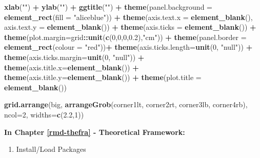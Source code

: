 \documentclass[12pt,twoside]{reedthesis}
\newenvironment{Shaded}{\begin{snugshade}}{\end{snugshade}}
\newcommand{\DataTypeTok}[1]{\textcolor[rgb]{0.13,0.29,0.53}{#1}}
\newcommand{\DecValTok}[1]{\textcolor[rgb]{0.00,0.00,0.81}{#1}}
\newcommand{\FloatTok}[1]{\textcolor[rgb]{0.00,0.00,0.81}{#1}}
\newcommand{\KeywordTok}[1]{\textcolor[rgb]{0.13,0.29,0.53}{\textbf{#1}}}
\newcommand{\NormalTok}[1]{#1}
\newcommand{\OperatorTok}[1]{\textcolor[rgb]{0.81,0.36,0.00}{\textbf{#1}}}
\newcommand{\StringTok}[1]{\textcolor[rgb]{0.31,0.60,0.02}{#1}}
\providecommand{\tightlist}{%
  \setlength{\itemsep}{0pt}\setlength{\parskip}{0pt}}
\begin{document}
\begin{Shaded}
\begin{Highlighting}[]
\StringTok{  }\KeywordTok{xlab}\NormalTok{(}\StringTok{""}\NormalTok{) }\OperatorTok{+}\StringTok{ }
\StringTok{  }\KeywordTok{ylab}\NormalTok{(}\StringTok{""}\NormalTok{) }\OperatorTok{+}\StringTok{ }
\StringTok{  }\KeywordTok{ggtitle}\NormalTok{(}\StringTok{""}\NormalTok{) }\OperatorTok{+}
\StringTok{  }\KeywordTok{theme}\NormalTok{(}\DataTypeTok{panel.background =} \KeywordTok{element_rect}\NormalTok{(}\DataTypeTok{fill =} \StringTok{"aliceblue"}\NormalTok{)) }\OperatorTok{+}
\StringTok{  }\KeywordTok{theme}\NormalTok{(}\DataTypeTok{axis.text.x =} \KeywordTok{element_blank}\NormalTok{(), }\DataTypeTok{axis.text.y =} \KeywordTok{element_blank}\NormalTok{()) }\OperatorTok{+}
\StringTok{  }\KeywordTok{theme}\NormalTok{(}\DataTypeTok{axis.ticks =} \KeywordTok{element_blank}\NormalTok{()) }\OperatorTok{+}
\StringTok{  }\KeywordTok{theme}\NormalTok{(}\DataTypeTok{plot.margin=}\NormalTok{grid}\OperatorTok{::}\KeywordTok{unit}\NormalTok{(}\KeywordTok{c}\NormalTok{(}\DecValTok{0}\NormalTok{,}\DecValTok{0}\NormalTok{,}\DecValTok{0}\NormalTok{,}\FloatTok{0.2}\NormalTok{),}\StringTok{"cm"}\NormalTok{)) }\OperatorTok{+}\StringTok{ }
\StringTok{  }\KeywordTok{theme}\NormalTok{(}\DataTypeTok{panel.border =} \KeywordTok{element_rect}\NormalTok{(}\DataTypeTok{colour =} \StringTok{"red"}\NormalTok{))}\OperatorTok{+}
\StringTok{  }\KeywordTok{theme}\NormalTok{(}\DataTypeTok{axis.ticks.length=}\KeywordTok{unit}\NormalTok{(}\DecValTok{0}\NormalTok{, }\StringTok{"null"}\NormalTok{)) }\OperatorTok{+}
\StringTok{  }\KeywordTok{theme}\NormalTok{(}\DataTypeTok{axis.ticks.margin=}\KeywordTok{unit}\NormalTok{(}\DecValTok{0}\NormalTok{, }\StringTok{"null"}\NormalTok{)) }\OperatorTok{+}
\StringTok{  }\KeywordTok{theme}\NormalTok{(}\DataTypeTok{axis.title.x=}\KeywordTok{element_blank}\NormalTok{()) }\OperatorTok{+}
\StringTok{  }\KeywordTok{theme}\NormalTok{(}\DataTypeTok{axis.title.y=}\KeywordTok{element_blank}\NormalTok{()) }\OperatorTok{+}
\StringTok{  }\KeywordTok{theme}\NormalTok{(}\DataTypeTok{plot.title =} \KeywordTok{element_blank}\NormalTok{())}

\KeywordTok{grid.arrange}\NormalTok{(big, }\KeywordTok{arrangeGrob}\NormalTok{(corner1lt, corner2rt, corner3lb, corner4rb), }\DataTypeTok{ncol=}\DecValTok{2}\NormalTok{, }\DataTypeTok{widths=}\KeywordTok{c}\NormalTok{(}\FloatTok{2.2}\NormalTok{,}\DecValTok{1}\NormalTok{))}
\end{Highlighting}
\end{Shaded}
\normalsize

\textbf{In Chapter \ref{rmd-thefra} - Theoretical Framework:}
\begin{enumerate}
\def\labelenumi{\arabic{enumi}.}
\tightlist
\item
  Install/Load Packages
\end{enumerate}
\tiny
\end{document}
